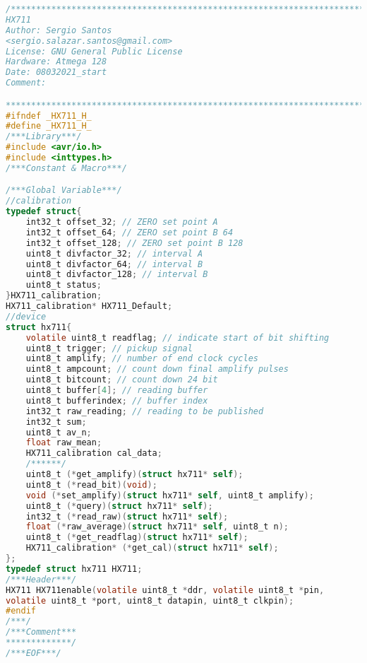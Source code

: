 \begin{lstlisting}[language=C, caption={hx711.h}, label=hx711-h, captionpos=b]
/************************************************************************
HX711
Author: Sergio Santos
<sergio.salazar.santos@gmail.com>
License: GNU General Public License
Hardware: Atmega 128
Date: 08032021_start
Comment:

************************************************************************/
#ifndef _HX711_H_
#define _HX711_H_
/***Library***/
#include <avr/io.h>
#include <inttypes.h>
/***Constant & Macro***/

/***Global Variable***/
//calibration
typedef struct{
	int32_t offset_32; // ZERO set point A
	int32_t offset_64; // ZERO set point B 64
	int32_t offset_128; // ZERO set point B 128
	uint8_t divfactor_32; // interval A
	uint8_t divfactor_64; // interval B
	uint8_t divfactor_128; // interval B
	uint8_t status;
}HX711_calibration;
HX711_calibration* HX711_Default;
//device
struct hx711{
	volatile uint8_t readflag; // indicate start of bit shifting
	uint8_t trigger; // pickup signal
	uint8_t amplify; // number of end clock cycles
	uint8_t ampcount; // count down final amplify pulses
	uint8_t bitcount; // count down 24 bit
	uint8_t buffer[4]; // reading buffer
	uint8_t bufferindex; // buffer index
	int32_t raw_reading; // reading to be published
	int32_t sum;
	uint8_t av_n;
	float raw_mean;
	HX711_calibration cal_data;
	/******/
	uint8_t (*get_amplify)(struct hx711* self);
	uint8_t (*read_bit)(void);
	void (*set_amplify)(struct hx711* self, uint8_t amplify);
	uint8_t (*query)(struct hx711* self);
	int32_t (*read_raw)(struct hx711* self);
	float (*raw_average)(struct hx711* self, uint8_t n);
	uint8_t (*get_readflag)(struct hx711* self);
	HX711_calibration* (*get_cal)(struct hx711* self);
};
typedef struct hx711 HX711;
/***Header***/
HX711 HX711enable(volatile uint8_t *ddr, volatile uint8_t *pin,
volatile uint8_t *port, uint8_t datapin, uint8_t clkpin);
#endif
/***/
/***Comment***
*************/
/***EOF***/
\end{lstlisting}
